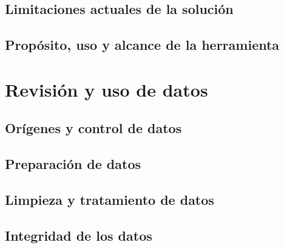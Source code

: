 \documentclass[10pt]{article}
\begin{document}
\subsection{Limitaciones actuales de la solución} %
\subsection{Propósito, uso y alcance de la herramienta} %
\section{Revisión y uso de datos}
\subsection{Orígenes y control de datos} %
\subsection{Preparación de datos} %
\subsection{Limpieza y tratamiento de datos} %
\subsection{Integridad de los datos} %
\end{document}
